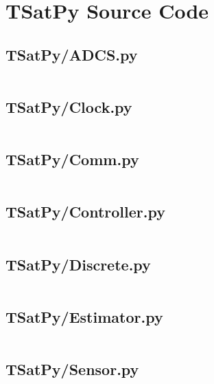 
\chapter{TSatPy Source Code}\label{ch:tsatpy_source}

\linespread{1}

\section{TSatPy/ADCS.py}\label{code:TSatPy/ADCS.py}\inputminted[linenos,fontsize=\scriptsize]{python}{/home/dcouture/git/mathyourlife/TSatPy/TSatPy/ADCS.py}

\section{TSatPy/Clock.py}\label{code:TSatPy/Clock.py}\inputminted[linenos,fontsize=\scriptsize]{python}{/home/dcouture/git/mathyourlife/TSatPy/TSatPy/Clock.py}

\section{TSatPy/Comm.py}\label{code:TSatPy/Comm.py}\inputminted[linenos,fontsize=\scriptsize]{python}{/home/dcouture/git/mathyourlife/TSatPy/TSatPy/Comm.py}

\section{TSatPy/Controller.py}\label{code:TSatPy/Controller.py}\inputminted[linenos,fontsize=\scriptsize]{python}{/home/dcouture/git/mathyourlife/TSatPy/TSatPy/Controller.py}

\section{TSatPy/Discrete.py}\label{code:TSatPy/Discrete.py}\inputminted[linenos,fontsize=\scriptsize]{python}{/home/dcouture/git/mathyourlife/TSatPy/TSatPy/Discrete.py}

\section{TSatPy/Estimator.py}\label{code:TSatPy/Estimator.py}\inputminted[linenos,fontsize=\scriptsize]{python}{/home/dcouture/git/mathyourlife/TSatPy/TSatPy/Estimator.py}

\section{TSatPy/Sensor.py}\label{code:TSatPy/Sensor.py}\inputminted[linenos,fontsize=\scriptsize]{python}{/home/dcouture/git/mathyourlife/TSatPy/TSatPy/Sensor.py}

